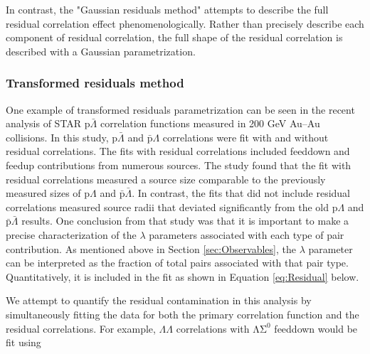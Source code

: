 In contrast, the "Gaussian residuals method" attempts to describe the full residual correlation effect phenomenologically.  
Rather than precisely describe each component of residual correlation, the full shape of the residual correlation is described with a Gaussian parametrization.  


\subsubsection{Transformed residuals method}
\label{sec:TransformedResiduals}


One example of transformed residuals parametrization can be seen in the recent analysis \cite{Kisiel:2014mma} of STAR p$\bar{\Lambda}$ correlation functions measured in 200 GeV Au--Au collisions.  
In this study, p$\bar{\Lambda}$ and $\bar{\mathrm{p}}\Lambda$ correlations were fit with and without residual correlations.  
The fits with residual correlations included feeddown and feedup contributions from numerous sources.  
The study found that the fit with residual correlations measured a source size comparable to the previously measured sizes of p$\Lambda$ and $\bar{\mathrm{p}}\bar{\Lambda}$.  
In contrast, the fits that did not include residual correlations measured source radii that deviated significantly from the old p$\Lambda$ and $\bar{\mathrm{p}}\bar{\Lambda}$ results.  
One conclusion from that study was that it is important to make a precise characterization of the $\lambda$ parameters associated with each type of pair contribution.  
As mentioned above in Section \ref{sec:Observables}, the $\lambda$ parameter can be interpreted as the fraction of total pairs associated with that pair type.  
Quantitatively, it is included in the fit as shown in Equation \ref{eq:Residual} below.

We attempt to quantify the residual contamination in this analysis by simultaneously fitting the data for both the primary correlation function and the residual correlations.  
For example, $\Lambda\Lambda$ correlations with $\mathrm{\Lambda\Sigma^0}$ feeddown would be fit using 

